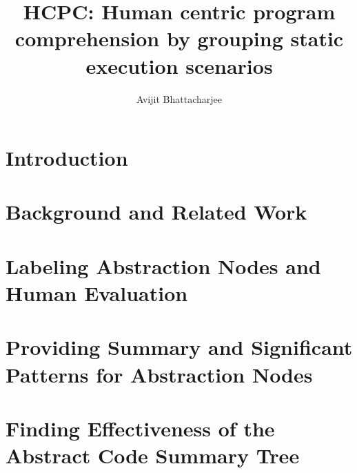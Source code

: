 \documentclass{uofsthesis-cs}
\title{HCPC: Human centric program comprehension by grouping static execution scenarios}
\author{Avijit Bhattacharjee}
\begin{document}
\maketitle

\frontmatter


\chapter{Introduction}




%
% 
% 
%


\chapter{Background and Related Work}


% 

\chapter{ Labeling Abstraction Nodes and Human Evaluation}


\chapter{ Providing Summary and Significant Patterns for Abstraction Nodes}


\chapter{Finding Effectiveness of the Abstract Code Summary Tree}

\end{document}
